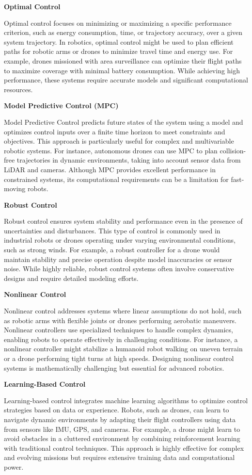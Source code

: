 \documentclass{book}
\providecommand{\ProjectDeepHeading}[2]{%
    \par\medskip\noindent\textbf{#2}\par\smallskip
}
\begin{document}
\ProjectDeepHeading{1}{Optimal Control}
Optimal control focuses on minimizing or maximizing a specific performance criterion, such as energy consumption, time, or trajectory accuracy, over a given system trajectory. In robotics, optimal control might be used to plan efficient paths for robotic arms or drones to minimize travel time and energy use. For example, drones missioned with area surveillance can optimize their flight paths to maximize coverage with minimal battery consumption. While achieving high performance, these systems require accurate models and significant computational resources.

\ProjectDeepHeading{1}{Model Predictive Control (MPC)}
Model Predictive Control predicts future states of the system using a model and optimizes control inputs over a finite time horizon to meet constraints and objectives. This approach is particularly useful for complex and multivariable robotic systems. For instance, autonomous drones can use MPC to plan collision-free trajectories in dynamic environments, taking into account sensor data from LiDAR and cameras. Although MPC provides excellent performance in constrained systems, its computational requirements can be a limitation for fast-moving robots.

\ProjectDeepHeading{1}{Robust Control}
Robust control ensures system stability and performance even in the presence of uncertainties and disturbances. This type of control is commonly used in industrial robots or drones operating under varying environmental conditions, such as strong winds. For example, a robust controller for a drone would maintain stability and precise operation despite model inaccuracies or sensor noise. While highly reliable, robust control systems often involve conservative designs and require detailed modeling efforts.

\ProjectDeepHeading{1}{Nonlinear Control}
Nonlinear control addresses systems where linear assumptions do not hold, such as robotic arms with flexible joints or drones performing aerobatic maneuvers. Nonlinear controllers use specialized techniques to handle complex dynamics, enabling robots to operate effectively in challenging conditions. For instance, a nonlinear controller might stabilize a humanoid robot walking on uneven terrain or a drone performing tight turns at high speeds. Designing nonlinear control systems is mathematically challenging but essential for advanced robotics.

\ProjectDeepHeading{1}{Learning-Based Control}
Learning-based control integrates machine learning algorithms to optimize control strategies based on data or experience. Robots, such as drones, can learn to navigate dynamic environments by adapting their flight controllers using data from sensors like IMU, GPS, and cameras. For example, a drone might learn to avoid obstacles in a cluttered environment by combining reinforcement learning with traditional control techniques. This approach is highly effective for complex and evolving missions but requires extensive training data and computational power.
\end{document}
